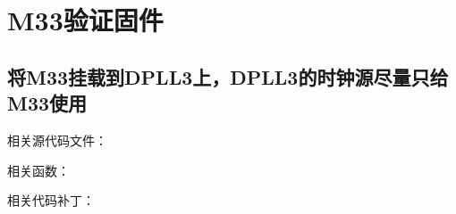 \documentclass[letterpaper,10pt,english]{sphinxmanual}
\begin{document}
\chapter{M33验证固件}
\label{\detokenize{r128_u9a8c_u8bc1_u56fa_u4ef6/r128_u9a8c_u8bc1_u56fa_u4ef6_u5f00_u53d1_u6307_u5357:m33}}

\section{将M33挂载到DPLL3上，DPLL3的时钟源尽量只给M33使用}
\label{\detokenize{r128_u9a8c_u8bc1_u56fa_u4ef6/r128_u9a8c_u8bc1_u56fa_u4ef6_u5f00_u53d1_u6307_u5357:id6}}
\sphinxAtStartPar
相关源代码文件：

\sphinxAtStartPar
相关函数：

\sphinxAtStartPar
相关代码补丁：
\end{document}
